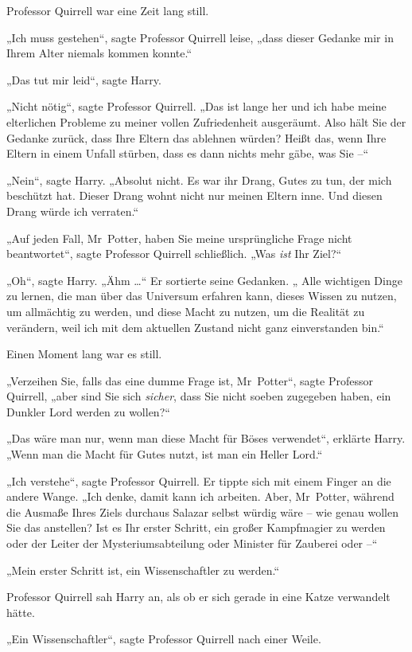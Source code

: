 {Professor Quirrell war eine Zeit lang still.

„Ich muss gestehen“, sagte Professor Quirrell leise, „dass dieser Gedanke mir in Ihrem Alter niemals kommen konnte.“

„Das tut mir leid“, sagte Harry.

„Nicht nötig“, sagte Professor Quirrell. „Das ist lange her und ich habe meine elterlichen Probleme zu meiner vollen Zufriedenheit ausgeräumt. Also hält Sie der Gedanke zurück, dass Ihre Eltern das ablehnen würden? Heißt das, wenn Ihre Eltern in einem Unfall stürben, dass es dann nichts mehr gäbe, was Sie --“

„Nein“, sagte Harry. „Absolut nicht. Es war ihr Drang, Gutes zu tun, der mich beschützt hat. Dieser Drang wohnt nicht nur meinen Eltern inne. Und diesen Drang würde ich verraten.“

„Auf jeden Fall, Mr~Potter, haben Sie meine ursprüngliche Frage nicht beantwortet“, sagte Professor Quirrell schließlich. „Was \emph{ist} Ihr Ziel?“

„Oh“, sagte Harry. „Ähm …“ Er sortierte seine Gedanken. „ Alle wichtigen Dinge zu lernen, die man über das Universum erfahren kann, dieses Wissen zu nutzen, um allmächtig zu werden, und diese Macht zu nutzen, um die Realität zu verändern, weil ich mit dem aktuellen Zustand nicht ganz einverstanden bin.“

Einen Moment lang war es still.

„Verzeihen Sie, falls das eine dumme Frage ist, Mr~Potter“, sagte Professor Quirrell, „aber sind Sie sich \emph{sicher}, dass Sie nicht soeben zugegeben haben, ein Dunkler Lord werden zu wollen?“

„Das wäre man nur, wenn man diese Macht für Böses verwendet“, erklärte Harry. „Wenn man die Macht für Gutes nutzt, ist man ein Heller Lord.“

„Ich verstehe“, sagte Professor Quirrell. Er tippte sich mit einem Finger an die andere Wange. „Ich denke, damit kann ich arbeiten. Aber, Mr~Potter, während die Ausmaße Ihres Ziels durchaus Salazar selbst würdig wäre -- wie genau wollen Sie das anstellen? Ist es Ihr erster Schritt, ein großer Kampfmagier zu werden oder der Leiter der Mysteriumsabteilung oder Minister für Zauberei oder --“

„Mein erster Schritt ist, ein Wissenschaftler zu werden.“

Professor Quirrell sah Harry an, als ob er sich gerade in eine Katze verwandelt hätte.

„Ein Wissenschaftler“, sagte Professor Quirrell nach einer Weile.

}
